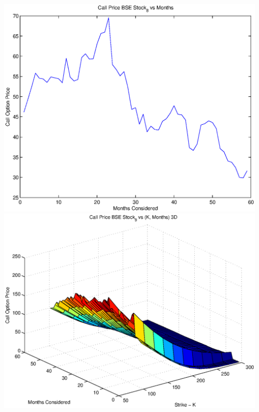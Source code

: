 \documentclass{article}
\begin{document}
\includegraphics[width=\textwidth]{Call_Price_BSE_Stock_8_vs_Months} \\

\includegraphics[width=\textwidth]{Call_Price_BSE_Stock_9_vs_(K,_Months)_3D} \\
\end{document}

